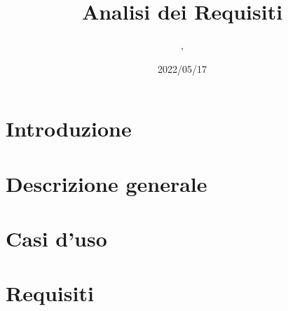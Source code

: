 \documentclass{classes/base}
\title{Analisi dei Requisiti}
\date{2022/05/17}
\author{\angela,\\ \giulio}
\begin{document}
	\maketitle
	\newpage
	
	\newpage
	\tableofcontents
	\newpage
	\listoftables
	\newpage
	\listoffigures
  
	\newpage
	\section{Introduzione}
	

	\newpage
	\section{Descrizione generale}
	

	\newpage
	\section{Casi d'uso}
	

	\newpage
	\section{Requisiti}
	
\end{document}
